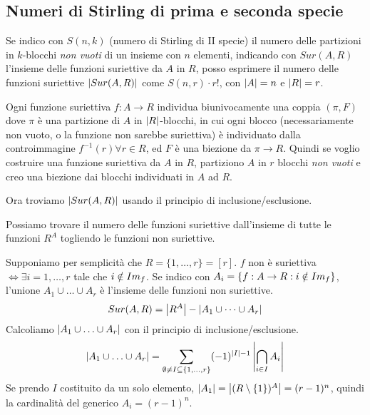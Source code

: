 \subsection{Numeri di Stirling di prima e seconda specie}




Se indico con $S(n, k)$ (numero di Stirling di II specie) il numero delle partizioni in $k$-blocchi \textit{non vuoti} di un insieme con $n$ elementi, indicando con $Sur(A, R)$ l'insieme delle funzioni suriettive da $A$ in $R$, posso esprimere il numero delle funzioni suriettive $\left\lvert{Sur(A,R)}\right\rvert $ come $S(n,r) \cdot r!$, con $\left\lvert{A}\right\rvert = n$ e $\left\lvert{R}\right\rvert = r$.

Ogni funzione suriettiva $f : A \to R $ individua biunivocamente una coppia $(\pi, F)$ dove $\pi$ \`e una partizione di $A$ in $\left\lvert{R}\right\rvert$-blocchi, in cui ogni blocco (necessariamente non vuoto, o la funzione non sarebbe suriettiva) \`e individuato dalla controimmagine $f^{-1}(r) \forall r \in R$, ed $F$ \`e una biezione da $\pi \to R$. Quindi se voglio costruire una funzione suriettiva da $A$ in $R$, partiziono $A$ in $r$ blocchi \textit{non vuoti} e creo una biezione dai blocchi individuati in $A$ ad $R$.

Ora troviamo $\left\lvert{Sur(A,R)}\right\rvert$ usando il principio di inclusione/esclusione.

Possiamo trovare il numero delle funzioni suriettive dall'insieme di tutte le funzioni $R^A$ togliendo le funzioni non suriettive.

Supponiamo per semplicit\`a che $R = \{ 1, \ldots , r\} = [r]$. $f$ non \`e suriettiva $\iff \exists i = 1, \ldots, r$ tale che $i \notin Im_{f}$. Se indico con $A_i = \{ f : A \to R : i \notin Im_{f} \}$, l'unione $A_1 \cup \ldots \cup A_r$ \`e l'insieme delle funzioni non suriettive.
\[
Sur(A,R) = \left\lvert{R^A}\right\rvert - \left\lvert{A_1 \cup \dots \cup A_r}\right\rvert
\]
Calcoliamo $\left\lvert{A_1 \cup \ldots \cup A_r}\right\rvert$ con il principio di inclusione/esclusione.
\[
\left\lvert{A_1 \cup \ldots \cup A_r}\right\rvert = 
\sum_{\emptyset \neq I \subseteq \{ 1, \ldots, r \}} (-1)^{\left\lvert{I}\right\rvert - 1} \left\lvert{\bigcap_{i \in I} A_i}\right\rvert
\]
Se prendo $I$ costituito da un solo elemento, $\left\lvert{A_1}\right\rvert = \left\lvert{(R \setminus \{ 1 \})^A}\right\rvert = (r - 1)^n$, quindi la cardinalit\`a del generico $A_i = (r-1)^n$.


